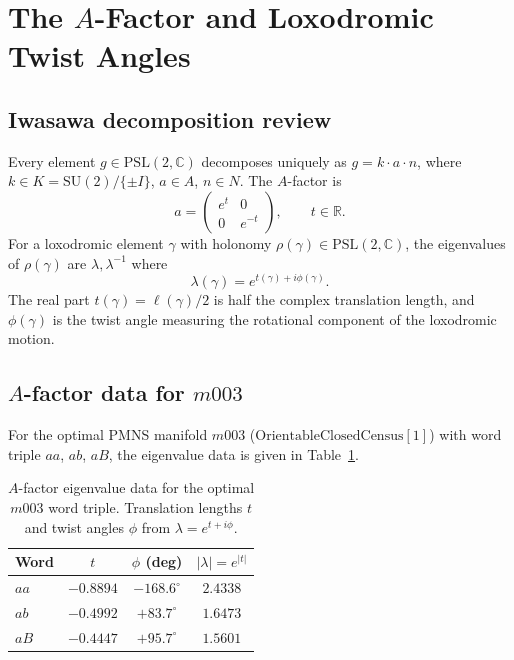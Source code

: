 ﻿\documentclass[epjc3]{svjour3}
\begin{document}
\section{The $A$-Factor and Loxodromic Twist Angles}
\label{sec:afactor}

\subsection{Iwasawa decomposition review}
\label{subsec:iwasawa}

Every element $g \in \mathrm{PSL}(2,\mathbb{C})$ decomposes uniquely
as $g = k \cdot a \cdot n$, where
$k \in K = \mathrm{SU}(2)/\{\pm I\}$, $a \in A$, $n \in N$.  The
$A$-factor is
\begin{equation}
  a = \begin{pmatrix} e^{t} & 0 \\ 0 & e^{-t} \end{pmatrix},
  \qquad t \in \mathbb{R}.
  \label{eq:afactor}
\end{equation}
For a loxodromic element $\gamma$ with holonomy
$\rho(\gamma) \in \mathrm{PSL}(2,\mathbb{C})$, the eigenvalues of
$\rho(\gamma)$ are $\lambda,\lambda^{-1}$ where
\begin{equation}
  \lambda(\gamma) = e^{t(\gamma)+i\phi(\gamma)}.
  \label{eq:eigenvalue}
\end{equation}
The real part $t(\gamma) = \ell(\gamma)/2$ is half the complex
translation length, and $\phi(\gamma)$ is the twist angle measuring
the rotational component of the loxodromic motion.

\subsection{$A$-factor data for $m003$}
\label{subsec:adata}

For the optimal PMNS manifold $m003$
($\mathrm{OrientableClosedCensus}[1]$) with word triple $aa$, $ab$,
$aB$, the eigenvalue data is given in Table~\ref{tab:afactor-m003}.

\begin{table}[ht]
\caption{$A$-factor eigenvalue data for the optimal $m003$ word
  triple.  Translation lengths $t$ and twist angles $\phi$ from
  $\lambda = e^{t+i\phi}$.}
\label{tab:afactor-m003}
\centering
\begin{tabular}{lccc}
\toprule
Word & $t$ & $\phi$ (deg) & $|\lambda| = e^{|t|}$ \\
\midrule
$aa$ & $-0.8894$ & $-168.6^\circ$ & $2.4338$ \\
$ab$ & $-0.4992$ & $+83.7^\circ$  & $1.6473$ \\
$aB$ & $-0.4447$ & $+95.7^\circ$  & $1.5601$ \\
\bottomrule
\end{tabular}
\end{table}
\end{document}
